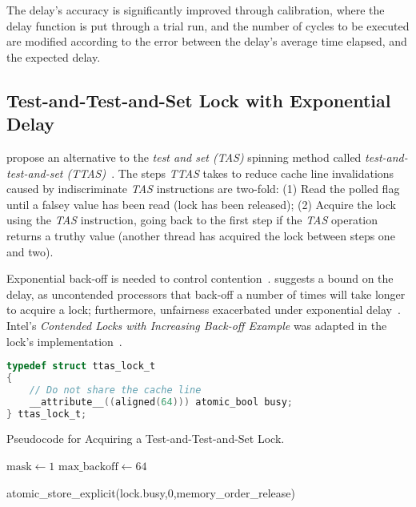 The delay's accuracy is significantly improved through calibration, where the
delay function is put through a trial run, and the number of cycles to be
executed are modified according to the error between the delay's average time
elapsed, and the expected delay.

\subsection{Test-and-Test-and-Set Lock with Exponential Delay}
\citeauthor{rudolph1984dynamic} propose an alternative to the \emph{test and set
(TAS)} spinning method called \emph{test-and-test-and-set
(TTAS)}~\citep{rudolph1984dynamic}. The steps \emph{TTAS} takes to reduce cache line
invalidations caused by indiscriminate \emph{TAS} instructions are two-fold: (1) Read
the polled flag until a falsey value has been read (lock has been released);
(2) Acquire the lock using the \emph{TAS} instruction, going back to the
first step if the \emph{TAS} operation returns a truthy value (another thread
has acquired the lock between steps one and two). 

Exponential back-off is needed to control
contention~\citep{valois1994queues}. \citeauthor{anderson1990performance}
suggests a bound on the delay, as uncontended processors that back-off a number
of times will take longer to acquire a lock; furthermore, unfairness
exacerbated under exponential delay~\citep[Section~7.4]{herlihy2020art}.
Intel's \emph{Contended Locks with Increasing
Back-off Example} was adapted in the lock's implementation~\citep{intelmanualoptimization}.

\begin{lstlisting}[language=C,caption={Test-and-Test-and-Set Lock Struct.}]
typedef struct ttas_lock_t
{
    // Do not share the cache line
    __attribute__((aligned(64))) atomic_bool busy;
} ttas_lock_t;

\end{lstlisting}

\begin{algorithm}
    \caption{Pseudocode for Acquiring a Test-and-Test-and-Set
    Lock.}\label{alg:ttas_acquire}
        $\text{mask} \gets 1$
        $\text{max\_backoff} \gets 64$
            {
            
        }
        atomic\_store\_explicit(lock.busy,0,memory\_order\_release)
\end{algorithm}

